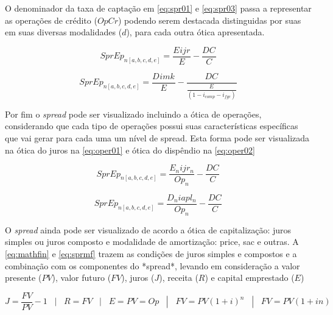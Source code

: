 \documentclass[
  12pt,
  12pt,
  openright,
  oneside,
  a4paper,
  chapter=TITLE,
  section=TITLE,
  subsection=TITLE,
  subsubsection=TITLE,
  portugues,
  sumario=tradicional]{abntex2}
\begin{document}
\begin{apendicesenv}
O denominador da taxa de captação em \autoref{eq:spr01} e \autoref{eq:spr03} passa a representar as operações de  crédito ($OpCr$) podendo serem destacada distinguidas por suas em  suas diversas  modalidades ($d$), para cada outra ótica apresentada. 


\begin{equation}\label{eq:spr01}
SprEp_{n[a,b,c,d,e]} =  \frac{E_{}ijr_{}}{E} - \frac{DC_{} }{C}
\end{equation}



\begin{equation}\label{eq:spr03}
SprEp_{n[a,b,c,d,e]} =  \frac{D_{}imk_{}}{E} - \frac{DC_{}}{\frac{E_{}}{(1 - i_{comp} - i_{fgc})}}
\end{equation}




Por fim o \emph{spread} pode ser visualizado incluindo a ótica de operações, considerando que cada tipo de operações possui suas características específicas que vai gerar para cada uma um nível de spread. Esta forma pode ser visualizada na ótica do juros na \autoref{eq:oper01} e ótica do dispêndio na \autoref{eq:oper02}  


\begin{equation}\label{eq:oper01}
SprEp_{n[a,b,c,d,e]} =  \frac{E_{n}ijr_{n}}{Op_{n}} - \frac{DC_{} }{C}
\end{equation}



\begin{equation}\label{eq:oper02}
SprEp_{n[a,b,c,d,e]} =  \frac{D_{n}iapl_{n}}{Op_{n}} - \frac{DC_{} }{C}
\end{equation}


O \emph{spread} ainda pode ser visualizado de acordo a ótica de capitalização: juros simples ou juros composto e modalidade de amortização: price, sac e outras. A \autoref{eq:mathfin} e \autoref{eq:sprmf} trazem as condições de juros simples e compostos e a combinação com os componentes do *spread*, levando em consideração a valor presente ($PV$), valor futuro ($FV$), juros ($J$), receita ($R$) e capital emprestado ($E$) 



\begin{equation}\label{eq:mathfin}
J = \frac{FV}{PV} - 1  \hspace{10pt} | \hspace{10pt} R = FV \hspace{10pt} | \hspace{10pt} E = PV = Op \hspace{10pt} | \hspace{10pt}  FV = PV(1 + i)^n  \hspace{10pt} |   \hspace{10pt} FV = PV(1 + i n)
\end{equation}





\end{apendicesenv}
\end{document}
